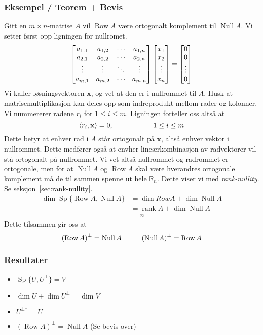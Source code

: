 \documentclass[12pt,a4paper,norsk]{article}
\makeatletter
\newcommand{\R}{\mathbb{R}}
\newcommand{\mat}[2]{\left[\begin{array}{@{}#1@{}}#2\end{array}\right]}
\newcommand{\inner}[1]{\langle#1\rangle}
\DeclareMathOperator{\Sp}{Sp} %
\DeclareMathOperator{\Row}{Row}
\DeclareMathOperator{\Null}{Null}
\DeclareMathOperator{\rank}{rank}
\newcommand{\vx}{\textbf{x}}
\makeatother
\begin{document}
\subsubsection{Eksempel / Teorem + Bevis}
Gitt en $m \times n$-matrise $A$ vil $\Row A$ være ortogonalt komplement til
$\Null A$. Vi setter først opp ligningen for nullromet.
\begin{align*}
  \mat{cccc}{a_{1,1} & a_{1,2} & \cdots & a_{1,n} \\ a_{2,1} & a_{2,2} & \cdots & a_{2,n} \\ \vdots & \vdots & \ddots & \vdots \\ a_{m,1} & a_{m,2} & \cdots & a_{m,n}}\mat{c}{x_{1} \\ x_{2} \\ \vdots \\ x_{n}} = \mat{c}{0 \\ 0 \\ \vdots \\ 0}
\end{align*}
Vi kaller løsningsvektoren $\vx$, og vet at den er i nullrommet til $A$.
Husk at matrisemultiplikasjon kan deles opp som indreprodukt mellom rader og
kolonner. Vi nummererer radene $r_{i}$ for $1 \le i \le m$. Ligningen forteller oss
altså at
\[\inner{r_{i}, \vx} = 0, \hspace{20mm} 1 \le i \le m\]
Dette betyr at enhver rad i $A$ står ortogonalt på $\vx$, altså enhver vektor i
nullrommet. Dette medfører også at envher lineærkombinasjon av radvektorer vil
stå ortogonalt på nullrommet. Vi vet altså nullrommet og radrommet er
ortogonale, men for at $\Null A$ og $\Row A$ skal være hverandres
ortogonale komplement må de til sammen spenne ut hele $\R_{n}$. Dette viser vi
med \textit{rank-nullity}. Se seksjon~\ref{sec:rank-nullity}.
\begin{align*}
  \dim \Sp\{\Row A, \Null A\} &= \dim Row A + \dim \Null A \\
                              &= \rank A + \dim \Null A \\
                              &= n
\end{align*}
Dette tilsammen gir oss at
\[{(\Row A)}^{\bot} = \Null A \hspace{10mm} {(\Null A)}^{\bot} = \Row A\]

\subsubsection{Resultater}
\begin{itemize}
  \item $\Sp\{U, U^{\perp}\} = V$
  \item $\dim U + \dim U^{\bot} = \dim V$
  \item $U^{\bot^\bot} = U$
  \item ${(\Row A)}^{\bot} = \Null A$ (Se bevis over)
\end{itemize}
\end{document}
